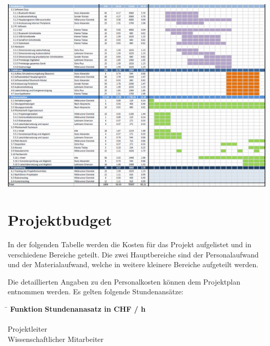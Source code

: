 \documentclass[10pt,a4paper,oneside]{99_fhnwreport}
\begin{document}
\begin{landscape}
\hspace*{-0.6cm}
\vspace*{2cm}
\includegraphics[height=\dimexpr\textheight-4\baselineskip\relax,page=1]{projektplan_2.pdf}
\end{landscape}
\newpage

\section{Projektbudget}\label{sec:projektbudget}
In der folgenden Tabelle  werden die Kosten für das Projekt aufgelistet und in verschiedene Bereiche geteilt. Die zwei Hauptbereiche sind der Personalaufwand und der Materialaufwand, welche in weitere kleinere Bereiche aufgeteilt werden.

\noindent
Die detaillierten Angaben zu den Personalkosten können dem Projektplan entnommen werden. Es gelten folgende Stundenansätze:

\begin{tabbing}
\hspace{80mm}			\= 	\hspace{10mm} 	\kill
\textbf{Funktion}		\> \textbf{Stundenanasatz in CHF / h} \\
\> \\
Projektleiter 			 	\\
Wissenschaftlicher Mitarbeiter 		\\
\end{tabbing}
\end{document}
